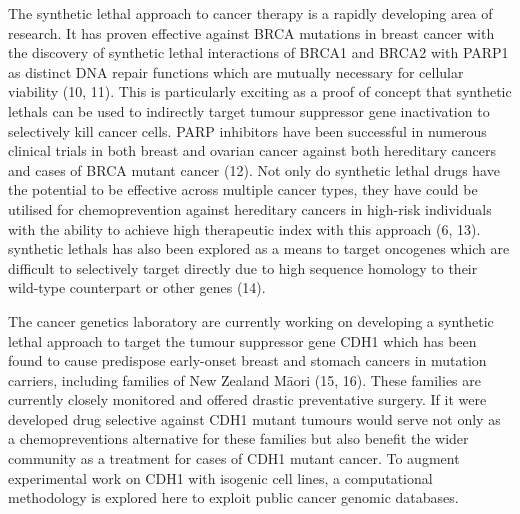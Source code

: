 The \gls{synthetic lethal} approach to cancer therapy is a rapidly developing area of research. It has proven effective against BRCA \glspl{mutation} in breast cancer with the discovery of \gls{synthetic lethal} interactions of BRCA1 and BRCA2 with PARP1 as distinct \acrshort{DNA} repair functions which are mutually necessary for cellular viability (10, 11). This is particularly exciting as a proof of concept that \glspl{synthetic lethal} can be used to indirectly target \gls{tumour suppressor} gene inactivation to selectively kill cancer cells. PARP inhibitors have been successful in numerous clinical trials in both breast and ovarian cancer against both \gls{hereditary} cancers and  cases of BRCA \gls{mutant} cancer (12). Not only do \gls{synthetic lethal} drugs have the potential to be effective across multiple cancer types, they have could be utilised for \gls{chemoprevention} against \gls{hereditary} cancers in high-risk individuals with the ability to achieve high therapeutic index with this approach (6, 13). \Glspl{synthetic lethal} has also been explored as a means to target \glspl{oncogene} which are difficult to selectively target directly due to high sequence homology to their \gls{wild-type} counterpart or other genes (14).

The cancer genetics laboratory are currently working on developing a \gls{synthetic lethal} approach to target the \gls{tumour suppressor} gene CDH1 which has been found to cause predispose early-onset breast and stomach cancers in \gls{mutation} carriers, including families of New Zealand M\={a}ori (15, 16). These families are currently closely monitored and offered drastic preventative surgery. If it were developed drug selective against CDH1 \gls{mutant} \glspl{tumour} would serve not only as a \glspl{chemoprevention} alternative for these families but also benefit the wider community as a treatment for  cases of CDH1 \gls{mutant} cancer. To augment experimental work on CDH1 with isogenic cell lines, a computational methodology is explored here to exploit public cancer \gls{genomic} databases.


